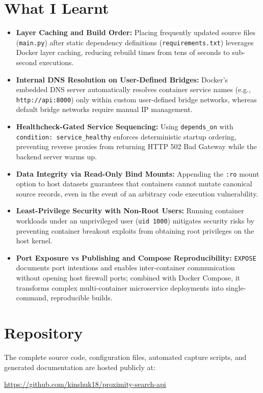 \documentclass[10pt,a4paper]{article}
\begin{document}
\section{What I Learnt}

\begin{itemize}
    \item \textbf{Layer Caching and Build Order:} Placing frequently updated source files (\texttt{main.py}) after static dependency definitions (\texttt{requirements.txt}) leverages Docker layer caching, reducing rebuild times from tens of seconds to sub-second executions.
    \item \textbf{Internal DNS Resolution on User-Defined Bridges:} Docker's embedded DNS server automatically resolves container service names (e.g., \texttt{http://api:8000}) only within custom user-defined bridge networks, whereas default bridge networks require manual IP management.
    \item \textbf{Healthcheck-Gated Service Sequencing:} Using \texttt{depends\_on} with \texttt{condition: service\_healthy} enforces deterministic startup ordering, preventing reverse proxies from returning HTTP 502 Bad Gateway while the backend server warms up.
    \item \textbf{Data Integrity via Read-Only Bind Mounts:} Appending the \texttt{:ro} mount option to host datasets guarantees that containers cannot mutate canonical source records, even in the event of an arbitrary code execution vulnerability.
    \item \textbf{Least-Privilege Security with Non-Root Users:} Running container workloads under an unprivileged user (\texttt{uid 1000}) mitigates security risks by preventing container breakout exploits from obtaining root privileges on the host kernel.
    \item \textbf{Port Exposure vs Publishing and Compose Reproducibility:} \texttt{EXPOSE} documents port intentions and enables inter-container communication without opening host firewall ports; combined with Docker Compose, it transforms complex multi-container microservice deployments into single-command, reproducible builds.
\end{itemize}

\section{Repository}

The complete source code, configuration files, automated capture scripts, and generated documentation are hosted publicly at:
\begin{center}
    \url{https://github.com/kinshuk18/proximity-search-api}
\end{center}
\end{document}
